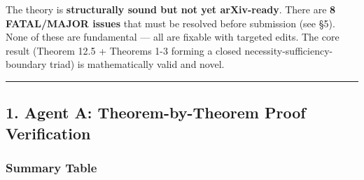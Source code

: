 \documentclass[
  12pt,
]{ctexart}
\begin{document}
The theory is \textbf{structurally sound but not yet arXiv-ready}. There
are \textbf{8 FATAL/MAJOR issues} that must be resolved before
submission (see §5). None of these are fundamental --- all are fixable
with targeted edits. The core result (Theorem 12.5 + Theorems 1-3
forming a closed necessity-sufficiency-boundary triad) is mathematically
valid and novel.

\begin{center}\rule{0.5\linewidth}{0.5pt}\end{center}

\subsection{1. Agent A: Theorem-by-Theorem Proof
Verification}\label{agent-a-theorem-by-theorem-proof-verification}

\subsubsection{Summary Table}\label{summary-table}
\end{document}
